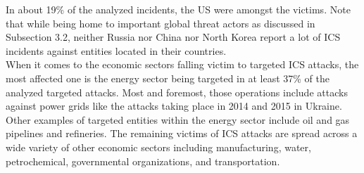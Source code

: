 \documentclass[runningheads]{llncs}
\begin{document}
In about 19\% of the analyzed incidents, the US were amongst the victims.
Note that while being home to important global threat actors as discussed in Subsection 3.2, neither Russia nor China nor North Korea report a lot of ICS incidents against entities located in their countries.
\\
When it comes to the economic sectors falling victim to targeted ICS attacks, the most affected one is the energy sector being targeted in at least 37\% of the analyzed targeted attacks.
Most and foremost, those operations include attacks against power grids like the attacks taking place in 2014 and 2015 in Ukraine.
Other examples of targeted entities within the energy sector include oil and gas pipelines and refineries.
The remaining victims of ICS attacks are spread across a wide variety of other economic sectors including manufacturing, water, petrochemical, governmental organizations, and transportation.
\end{document}

